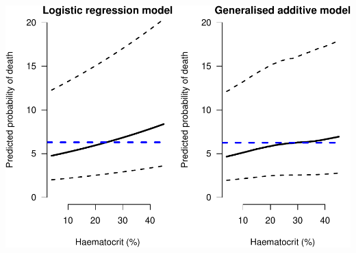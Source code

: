 \documentclass[]{article}
\begin{document}
\includegraphics{LegacyAnalysis_files/figure-latex/counterfactualPlots-1.pdf}
\end{document}
